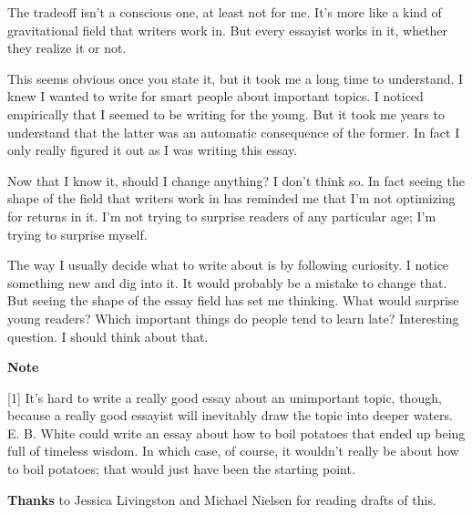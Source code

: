 The tradeoff isn't a conscious one, at least not for me. It's more like
a kind of gravitational field that writers work in. But every essayist
works in it, whether they realize it or not.

This seems obvious once you state it, but it took me a long time to
understand. I knew I wanted to write for smart people about important
topics. I noticed empirically that I seemed to be writing for the young.
But it took me years to understand that the latter was an automatic
consequence of the former. In fact I only really figured it out as I was
writing this essay.

Now that I know it, should I change anything? I don't think so. In fact
seeing the shape of the field that writers work in has reminded me that
I'm not optimizing for returns in it. I'm not trying to surprise readers
of any particular age; I'm trying to surprise myself.

The way I usually decide what to write about is by following curiosity.
I notice something new and dig into it. It would probably be a mistake
to change that. But seeing the shape of the essay field has set me
thinking. What would surprise young readers? Which important things do
people tend to learn late? Interesting question. I should think about
that.

\textbf{Note}

{[}1{]} It's hard to write a really good essay about an unimportant
topic, though, because a really good essayist will inevitably draw the
topic into deeper waters. E. B. White could write an essay about how to
boil potatoes that ended up being full of timeless wisdom. In which
case, of course, it wouldn't really be about how to boil potatoes; that
would just have been the starting point.

\textbf{Thanks} to Jessica Livingston and Michael Nielsen for reading
drafts of this.
